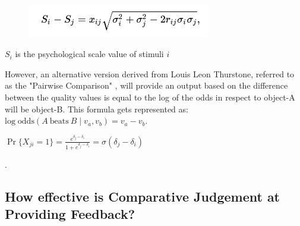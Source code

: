 		\begin{figure}[h]
			\includegraphics[width=8cm]{graphics/LCJ_formula.png}
			\caption{}
			\centering
		\end{figure}
	
		 $S_{i}$ is the psychological scale value of stimuli $i$
		
		However, an alternative version derived from Louis Leon Thurstone, referred to as the "Pairwise Comparison" \cite{thurstone1927law}, will provide an output based on the difference between the quality values is equal to the log of the odds in respect to object-A will be object-B. This formula gets represented as: 
		$\displaystyle \mathrm {log\;odds} (A\ {\text{beats}}\ B\mid v_{a},v_{b})=v_{a}-v_{b} $.
		
		$\Pr\{X_{ji}=1\}={\frac {e^{{\delta _{j}}-{\delta _{i}}}}{1+e^{{\delta _{j}}-{\delta _{i}}}}}=\sigma (\delta _{j}-\delta _{i})$
		
		 .


	\subsection{How effective is Comparative Judgement at Providing Feedback?} %
		
	
